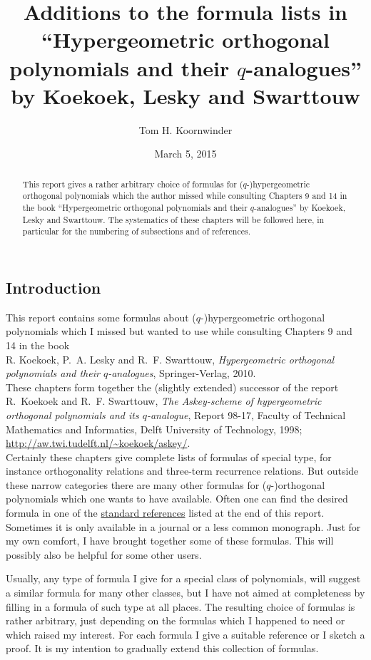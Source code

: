\documentclass[twoside,11pt]{article}
\newcommand\sa{\smallskipamount}
\newcommand\sLP{\\[\sa]}
\newcommand\sPP{\\[\sa]\indent}
\begin{document}
\title{Additions to the formula lists in
``Hypergeometric orthogonal polynomials and their $q$-analogues''
by Koekoek, Lesky and Swarttouw}
\author{Tom H. Koornwinder}
\date{March 5, 2015}
\maketitle
\begin{abstract}
This report gives a rather arbitrary choice of formulas for
($q$-)hypergeometric orthogonal polynomials which the author missed
while consulting Chapters 9 and 14 in the book
``Hypergeometric orthogonal polynomials and their $q$-analogues''
by Koekoek, Lesky and Swarttouw. The systematics of these chapters will be followed
here, in particular for the numbering of subsections and of references.
\end{abstract}
%
\subsection*{Introduction}
\label{sec_intro}
This report contains some formulas about ($q$-)hypergeometric
orthogonal polynomials which I missed but wanted to use
while consulting Chapters 9 and 14 in the book
\sLP
R. Koekoek, P.~A. Lesky and R.~F. Swarttouw,
{\em Hypergeometric orthogonal polynomials and their $q$-analogues},
Springer-Verlag, 2010.
\sLP
These chapters form together the (slightly extended) successor of the report
\sLP
R.~Koekoek and  R.~F. Swarttouw,
{\em The Askey-scheme of hypergeometric orthogonal
polynomials and its $q$-analogue},
Report 98-17, Faculty of Technical Mathematics and Informatics,
Delft University of Technology, 1998;
\url{http://aw.twi.tudelft.nl/~koekoek/askey/}.
\sPP
Certainly these chapters give complete lists of formulas of special type, for instance
orthogonality relations and three-term recurrence relations. But outside these narrow
categories there are many other
formulas for ($q$-)orthogonal polynomials which one wants to have available.
Often one can find the desired formula in one of the 
\hyperref[sec_ref1]{standard references} listed at the end of this report.
Sometimes it is only available in a journal or a less common monograph.
Just for my own comfort, I have brought together some of these formulas.
This will possibly also be helpful for some other users.

Usually, any type of formula I give for a special class of polynomials, will suggest
a similar formula for many other classes, but I have not aimed at completeness
by filling in a formula of such type at all places. The resulting choice of formulas is
rather arbitrary, just depending on the formulas which I happened to need or which raised my interest.
For each formula I give  a suitable reference or I sketch a
proof.
It is my intention to gradually extend this collection of formulas.
%
\end{document}
